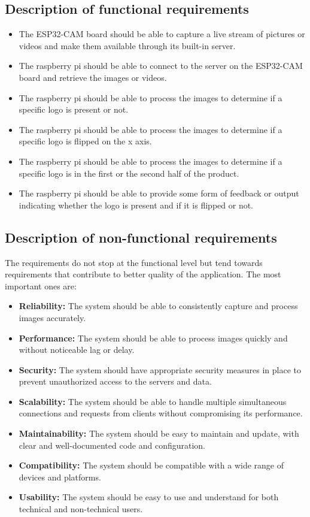\subsection{Description of functional requirements}
\begin{itemize}
\item The ESP32-CAM board should be able to capture a live stream of pictures or videos and make them available through its built-in server.
\item The raspberry pi should be able to connect to the server on the ESP32-CAM board and retrieve the images or videos.
\item The raspberry pi should be able to process the images to determine if a specific logo is present or not.
\item The raspberry pi should be able to process the images to determine if a specific logo is flipped on the x axis.
\item The raspberry pi should be able to process the images to determine if a specific logo is in the first or the second half of the product.
\item The raspberry pi should be able to provide some form of feedback or output indicating whether the logo is present and if it is flipped or not.
\end{itemize}
\subsection{Description of non-functional requirements}
The requirements do not stop at the functional level but tend towards requirements that contribute to better quality of the application. The most important ones are:
\begin{itemize}
\item \textbf{Reliability:} The system should be able to consistently capture and process images accurately.
\item \textbf{Performance:} The system should be able to process images quickly and without noticeable lag or delay.
\item \textbf{Security:} The system should have appropriate security measures in place to prevent unauthorized access to the servers and data.
\item \textbf{Scalability:} The system should be able to handle multiple simultaneous connections and requests from clients without compromising its performance.
\item \textbf{Maintainability:} The system should be easy to maintain and update, with clear and well-documented code and configuration.
\item \textbf{Compatibility:} The system should be compatible with a wide range of devices and platforms.
\item \textbf{Usability:} The system should be easy to use and understand for both technical and non-technical users.
\end{itemize}

